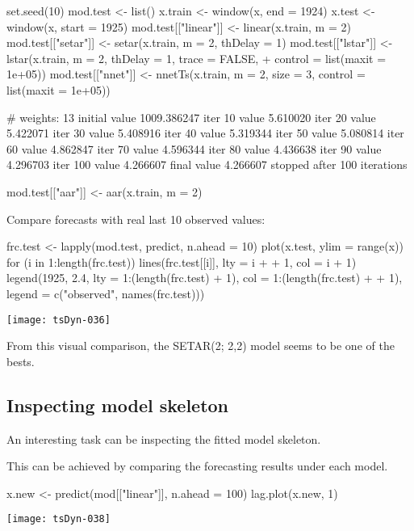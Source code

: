 \documentclass[a4paper]{article}
\begin{document}
\begin{Schunk}
\begin{Sinput}
 set.seed(10)
 mod.test <- list()
 x.train <- window(x, end = 1924)
 x.test <- window(x, start = 1925)
 mod.test[["linear"]] <- linear(x.train, m = 2)
 mod.test[["setar"]] <- setar(x.train, m = 2, thDelay = 1)
 mod.test[["lstar"]] <- lstar(x.train, m = 2, thDelay = 1, trace = FALSE, 
+     control = list(maxit = 1e+05))
 mod.test[["nnet"]] <- nnetTs(x.train, m = 2, size = 3, control = list(maxit = 1e+05))
\end{Sinput}
\begin{Soutput}
# weights:  13
initial  value 1009.386247 
iter  10 value 5.610020
iter  20 value 5.422071
iter  30 value 5.408916
iter  40 value 5.319344
iter  50 value 5.080814
iter  60 value 4.862847
iter  70 value 4.596344
iter  80 value 4.436638
iter  90 value 4.296703
iter 100 value 4.266607
final  value 4.266607 
stopped after 100 iterations
\end{Soutput}
\begin{Sinput}
 mod.test[["aar"]] <- aar(x.train, m = 2)
\end{Sinput}
\end{Schunk}

Compare forecasts with real last 10 observed values:
\begin{Schunk}
\begin{Sinput}
 frc.test <- lapply(mod.test, predict, n.ahead = 10)
 plot(x.test, ylim = range(x))
 for (i in 1:length(frc.test)) lines(frc.test[[i]], lty = i + 
+     1, col = i + 1)
 legend(1925, 2.4, lty = 1:(length(frc.test) + 1), col = 1:(length(frc.test) + 
+     1), legend = c("observed", names(frc.test)))
\end{Sinput}
\end{Schunk}
\texttt{[image: tsDyn-036]}

From this visual comparison, the SETAR(2; 2,2) model seems to be one of the bests.

\subsection{Inspecting model skeleton}
An interesting task can be inspecting the fitted model skeleton.

This can be achieved by comparing the forecasting results under each model.
\begin{Schunk}
\begin{Sinput}
 x.new <- predict(mod[["linear"]], n.ahead = 100)
 lag.plot(x.new, 1)
\end{Sinput}
\end{Schunk}
\texttt{[image: tsDyn-038]}
\end{document}
